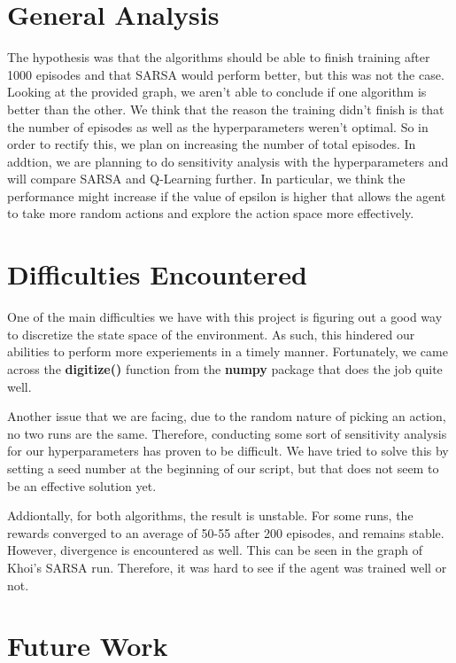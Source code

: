 \documentclass[nohyperref]{article}
\theoremstyle{plain}
\theoremstyle{definition}
\theoremstyle{remark}
\begin{document}
\section{General Analysis}

The hypothesis was that the algorithms should be able to finish training after 1000 episodes and that SARSA would perform better, but this was not the case.
Looking at the provided graph, we aren't able to conclude if one algorithm is better than the other.
We think that the reason the training didn't finish is that the number of episodes as well as the hyperparameters weren't optimal. 
So in order to rectify this, we plan on increasing the number of total episodes. 
In addtion, we are planning to do sensitivity analysis with the hyperparameters and will compare SARSA and Q-Learning further.
In particular, we think the performance might increase if the value of epsilon is higher that allows the agent to take more random actions and explore the action space more effectively.

\section{Difficulties Encountered}

One of the main difficulties we have with this project is figuring out a good way to discretize the state space of the environment.
As such, this hindered our abilities to perform more experiements in a timely manner.
Fortunately, we came across the \textbf{digitize()} function from the \textbf{numpy} package that does the job quite well.

Another issue that we are facing, due to the random nature of picking an action, no two runs are the same. Therefore, conducting some sort of
sensitivity analysis for our hyperparameters has proven to be difficult. We have tried to solve this by setting a seed number at the beginning
of our script, but that does not seem to be an effective solution yet.

Addiontally, for both algorithms, the result is unstable. For some runs, the rewards converged to an average of 50-55 after 200 episodes, and remains stable. However, divergence is encountered
as well. This can be seen in the graph of Khoi's SARSA run. Therefore, it was hard to see if the agent was trained well or not.

\section{Future Work}
\end{document}
